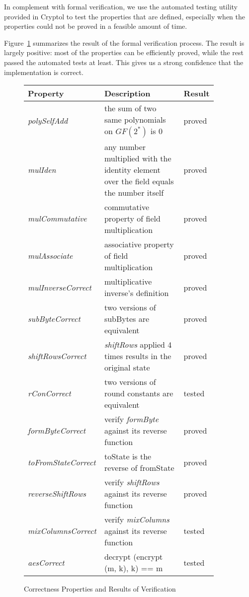 \documentclass[a4paper, notitlepage]{report}
\begin{document}
In complement with formal verification, we use the automated testing utility
provided in Cryptol to test the properties that are defined, especially when the
properties could not be proved in a feasible amount of time.

Figure~\ref{fig:properties} summarizes the result of the formal verification process.
The result is largely positive: most of the properties can be efficiently proved,
while the rest passed the automated tests at least. This gives us a strong confidence
that the implementation is correct.

\begin{figure}
  \begin{center}
    \begin{tabular}{|p{0.25\linewidth} | p{0.5\linewidth} | p{0.15\linewidth} |}
      \hline
      Property & Description & Result \\
      \hline
      \emph{polySelfAdd} & the sum of two same polynomials on $GF(2^*)$ is 0
      & proved \\
      \hline
      \emph{mulIden} & any number multiplied with the identity element over
      the field equals the number itself & proved \\
      \hline
      \emph{mulCommutative} & commutative property of field multiplication
      & proved \\
      \hline
      \emph{mulAssociate} & associative property of field multiplication
      & proved \\
      \hline
      \emph{mulInverseCorrect} & multiplicative inverse's definition
      & proved \\
      \hline
      \emph{subByteCorrect} & two versions of subBytes are equivalent
      & proved \\
      \hline
      \emph{shiftRowsCorrect} & \emph{shiftRows} applied 4 times results in the original state
      & proved \\
      \hline
      \emph{rConCorrect} & two versions of round constants are equivalent
      & tested \\
      \hline
      \emph{formByteCorrect} & verify \emph{formByte} against its reverse function
      & proved \\
      \hline
      \emph{toFromStateCorrect} &  toState is the reverse of fromState
      & proved \\
      \hline
      \emph{reverseShiftRows} & verify \emph{shiftRows} against its reverse function
      & proved \\
      \hline
      \emph{mixColumnsCorrect} & verify \emph{mixColumns} against its reverse function
      & tested \\
      \hline
      \emph{aesCorrect} & decrypt (encrypt (m, k), k) == m
      & tested \\
      \hline
    \end{tabular}
  \end{center}
  \caption{Correctness Properties and Results of Verification}
  \label{fig:properties}
\end{figure}
\end{document}
